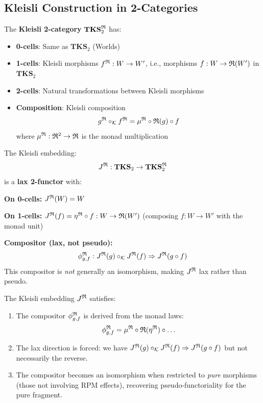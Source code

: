 \subsection{Kleisli Construction in 2-Categories}

\begin{definition}
\label{def:kleisli-2-cat}
The \textbf{Kleisli 2-category} $\mathbf{TKS}_2^{\mathfrak{R}}$ has:
\begin{itemize}
  \item \textbf{0-cells}: Same as $\mathbf{TKS}_2$ (Worlds)
  \item \textbf{1-cells}: Kleisli morphisms $f^{\mathfrak{R}} : W \to W'$, i.e., morphisms
        $f : W \to \mathfrak{R}(W')$ in $\mathbf{TKS}_2$
  \item \textbf{2-cells}: Natural transformations between Kleisli morphisms
  \item \textbf{Composition}: Kleisli composition
        \[
          g^{\mathfrak{R}} \circ_{\mathcal{K}} f^{\mathfrak{R}} = \mu^{\mathfrak{R}} \circ \mathfrak{R}(g) \circ f
        \]
        where $\mu^{\mathfrak{R}} : \mathfrak{R}^2 \to \mathfrak{R}$ is the monad multiplication
\end{itemize}
\end{definition}

\begin{definition}
\label{def:kleisli-lax}
The Kleisli embedding:
\[
  J^{\mathfrak{R}} : \mathbf{TKS}_2 \to \mathbf{TKS}_2^{\mathfrak{R}}
\]
is a \textbf{lax 2-functor} with:

\textbf{On 0-cells:} $J^{\mathfrak{R}}(W) = W$

\textbf{On 1-cells:} $J^{\mathfrak{R}}(f) = \eta^{\mathfrak{R}} \circ f : W \to \mathfrak{R}(W')$
(composing $f : W \to W'$ with the monad unit)

\textbf{Compositor (lax, not pseudo):}
\[
  \phi^{\mathfrak{R}}_{g,f} : J^{\mathfrak{R}}(g) \circ_{\mathcal{K}} J^{\mathfrak{R}}(f) \Rightarrow J^{\mathfrak{R}}(g \circ f)
\]
This compositor is \emph{not} generally an isomorphism, making $J^{\mathfrak{R}}$ lax
rather than pseudo.
\end{definition}

\begin{proposition}
\label{prop:rpm-lax}
The Kleisli embedding $J^{\mathfrak{R}}$ satisfies:
\begin{enumerate}[label=(\alph*)]
  \item The compositor $\phi^{\mathfrak{R}}_{g,f}$ is derived from the monad laws:
        \[
          \phi^{\mathfrak{R}}_{g,f} = \mu^{\mathfrak{R}} \circ \mathfrak{R}(\eta^{\mathfrak{R}}) \circ \ldots
        \]
  \item The lax direction is forced: we have
        $J^{\mathfrak{R}}(g) \circ_{\mathcal{K}} J^{\mathfrak{R}}(f) \Rightarrow J^{\mathfrak{R}}(g \circ f)$
        but not necessarily the reverse.
  \item The compositor becomes an isomorphism when restricted to \emph{pure}
        morphisms (those not involving RPM effects), recovering pseudo-functoriality
        for the pure fragment.
\end{enumerate}
\end{proposition}


